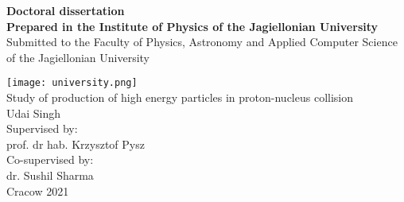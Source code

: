 \begin{titlepage}
	\begin{center}
		\vspace*{1cm}
		\textbf{\Large Doctoral dissertation}\\[0.5cm]	
		\textbf{Prepared in the Institute of Physics
			of the Jagiellonian University}\\[0.5cm]	
		Submitted to the Faculty of Physics,
		Astronomy and Applied Computer Science
		of the Jagiellonian University

		\vspace{1.0cm}
		{\texttt{[image: university.png]}}	\\
		\vspace{1.0cm}
		\Large Study of production of high energy particles 
		in proton-nucleus collision \\
		\vspace{0.5cm}
		\Large Udai Singh\\
		\vspace{0.5cm}
		\large Supervised by:\\
		prof. dr hab. Krzysztof Pysz\\
		\vspace{0.5cm}
		Co-supervised by:\\
		dr. Sushil Sharma\\
			\vfill
		Cracow 2021
	\end{center}
\end{titlepage}